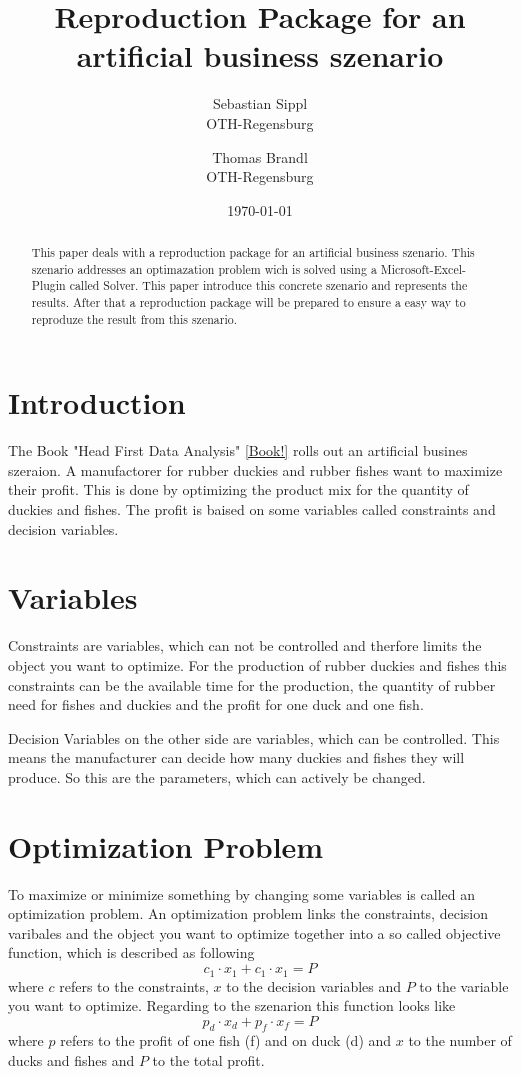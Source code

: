 \documentclass{article}
\title{\textbf{Reproduction Package for an artificial business szenario}}
\author{Sebastian Sippl  \\
	OTH-Regensburg  \\
	\and 
	Thomas Brandl \\
	OTH-Regensburg  \\
	}
\date{\today}
\begin{document}
\maketitle


\begin{abstract}
This paper deals with a reproduction package for an artificial business szenario. This szenario addresses an optimazation problem wich is solved using a Microsoft-Excel-Plugin called Solver. This paper introduce this concrete szenario and represents the results. After that a reproduction package will be prepared to ensure a easy way to reproduze the result from this szenario.
\end{abstract}

\begin{multicols}{2}

\section{Introduction}
The Book "Head First Data Analysis" \ref{Book!} rolls out an artificial busines szeraion. A manufactorer for rubber duckies and rubber fishes want to maximize their profit. This is done by optimizing the product mix for the quantity of duckies and fishes. The profit is baised on some variables called constraints and decision variables. 

\section{Variables}
Constraints are variables, which can not be controlled and therfore limits the object you want to optimize. For the production of rubber duckies and fishes this constraints can be the available time for the production, the quantity of rubber need for fishes and duckies and the profit for one duck and one fish.

Decision Variables on the other side are variables, which can be controlled. This means the manufacturer can decide how many duckies and fishes they will produce. So this are the parameters, which can actively be changed. 


\section{Optimization Problem}
To maximize or minimize something by changing some variables is called an optimization problem. An optimization problem links the constraints, decision varibales and the object you want to optimize together into a so called objective function, which is described as following
\begin{equation}
c_{1}\cdot x_{1} + c_{1}\cdot x_{1} = P
\end{equation}
where $c$ refers to the constraints, $x$ to the decision variables and $P$ to the variable you want to optimize. Regarding to the szenarion this function looks like 
\begin{equation}
p_{d}\cdot x_{d} + p_{f}\cdot x_{f} = P
\end{equation}
where $p$ refers to the profit of one fish (f) and on duck (d) and $x$ to the number of ducks and fishes and $P$ to the total profit.


\end{multicols}
\end{document}
